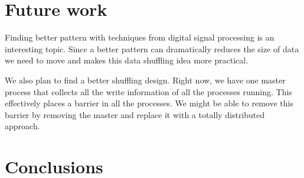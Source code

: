 \documentclass{acm_proc_article-sp}
\begin{document}
\section{Future work}
\label{sec:future-work}
Finding better pattern with techniques
from digital signal processing is an interesting
topic. Since a better pattern can dramatically
reduces the size of data we need
to move and makes this data shuffling
idea more practical. 

We also plan to find a better shuffling
design. Right now, we have one master process
that collects all the write information of all
the processes running. This effectively
places a barrier in all the processes. We
might be able to remove this barrier by
removing the master and replace it with a
totally distributed approach.


\section{Conclusions}
\label{sec:conclusions}






  
\end{document}
